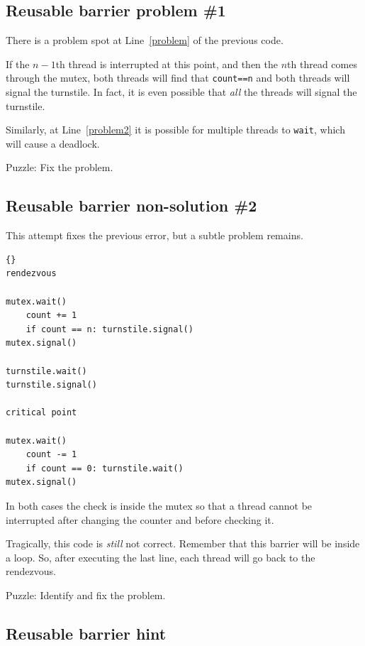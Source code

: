 \documentclass{book}
\newcommand{\clearemptydoublepage}{\newpage\cleardoublepage}
\begin{document}
\clearemptydoublepage
\subsection {Reusable barrier problem \#1}

There is a problem spot at Line~\ref{problem} of the previous code.

If the $n-1$th thread is interrupted at this point,
and then the $n$th thread comes through the mutex,
both threads will find that {\tt count==n} and both
threads will signal the turnstile.  In fact, it is even
possible that {\em all} the threads will signal the turnstile.

Similarly, at Line~\ref{problem2} it is possible for multiple
threads to {\tt wait}, which will cause a deadlock.

Puzzle: Fix the problem.

\clearemptydoublepage
\subsection {Reusable barrier non-solution \#2}

This attempt fixes the previous error, but a subtle problem
remains.

\begin{lstlisting}[caption={Reusable barrier non-solution}]{}
rendezvous

mutex.wait()
    count += 1
    if count == n: turnstile.signal()
mutex.signal()

turnstile.wait()
turnstile.signal()

critical point

mutex.wait()
    count -= 1
    if count == 0: turnstile.wait()
mutex.signal()
\end{lstlisting}

In both cases the check is inside the mutex so that
a thread cannot be interrupted after changing the counter
and before checking it.

Tragically, this code is {\em still} not correct.
Remember that this barrier will be inside a loop.  So, after
executing the last line, each thread will go back
to the rendezvous.

Puzzle: Identify and fix the problem.


\clearemptydoublepage
\subsection {Reusable barrier hint}
\end{document}
